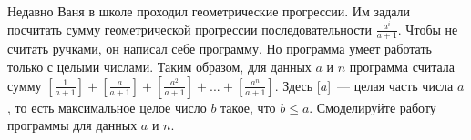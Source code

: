 Недавно Ваня в школе проходил геометрические прогрессии. Им задали посчитать сумму геометрической прогрессии последовательности $\frac{a^i}{a + 1}$. Чтобы не считать ручками, он написал себе программу. Но программа умеет работать только с целыми числами. Таким образом, для данных $a$ и $n$ программа считала сумму $[\frac{1}{a+1}] + [\frac{a}{a+1}] + [\frac{a^2}{a+1}] + ... + [\frac{a^n}{a+1}]$. Здесь [$a$]~--- целая часть числа $a$, то есть максимальное целое число $b$ такое, что $b \leq a$. Смоделируйте работу программы для данных $a$ и $n$.